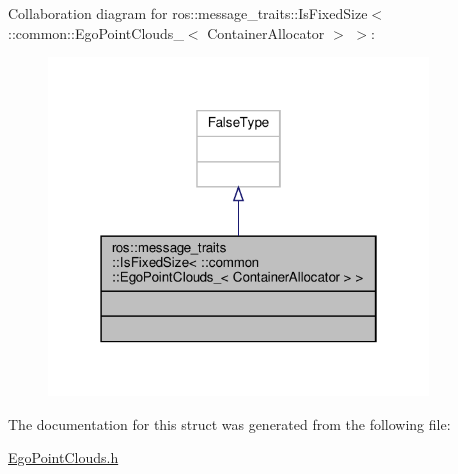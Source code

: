 Collaboration diagram for ros\+:\+:message\+\_\+traits\+:\+:Is\+Fixed\+Size$<$ \+:\+:common\+:\+:Ego\+Point\+Clouds\+\_\+$<$ Container\+Allocator $>$ $>$\+:\nopagebreak
\begin{figure}[H]
\begin{center}
\leavevmode
\includegraphics[width=286pt]{d9/d96/structros_1_1message__traits_1_1IsFixedSize_3_01_1_1common_1_1EgoPointClouds___3_01ContainerAllocator_01_4_01_4__coll__graph}
\end{center}
\end{figure}


The documentation for this struct was generated from the following file\+:\begin{DoxyCompactItemize}
\item 
\hyperlink{EgoPointClouds_8h}{Ego\+Point\+Clouds.\+h}\end{DoxyCompactItemize}
